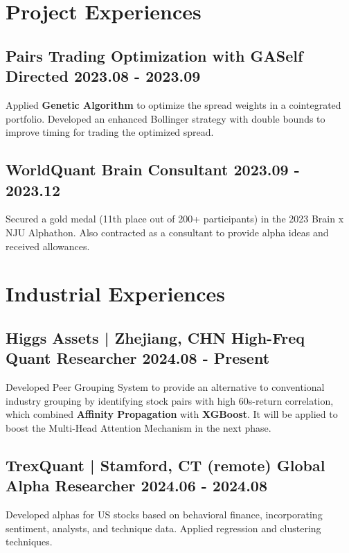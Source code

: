 \documentclass[a4paper]{article}
\begin{document}
\newpage

\section{Project Experiences} %
\subsection{Pairs Trading Optimization with GA\normalfont \hfill Self Directed \hspace{40pt} 2023.08 - 2023.09}
Applied \textbf{Genetic Algorithm} to optimize the spread weights in a cointegrated portfolio. Developed an enhanced Bollinger strategy with double bounds to improve timing for trading the optimized spread.

\subsection{WorldQuant Brain \normalfont \hfill Consultant\hspace{40pt} 2023.09 - 2023.12}
Secured a gold medal (11th place out of 200+ participants) in the 2023 Brain x NJU Alphathon. Also contracted as a consultant to provide alpha ideas and received allowances.

\section{Industrial Experiences} %
\subsection{Higgs Assets \normalfont | Zhejiang, CHN  \hfill High-Freq Quant Researcher \hspace{40pt} 2024.08 - Present}
Developed Peer Grouping System to provide an alternative to conventional industry grouping by identifying stock pairs with high 60s-return correlation, which combined \textbf{Affinity Propagation} with \textbf{XGBoost}. It will be applied to boost the Multi-Head Attention Mechanism in the next phase. 
\subsection{TrexQuant \normalfont | Stamford, CT (remote) \hfill Global Alpha Researcher \hspace{40pt} 2024.06 - 2024.08}
Developed alphas for US stocks based on behavioral finance, incorporating sentiment, analysts, and technique data. Applied regression and clustering techniques.
\end{document}
